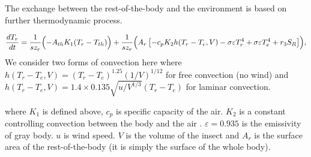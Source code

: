 The exchange between the rest-of-the-body and the environment is based on further thermodynamic process. 

\begin{equation} \label{eq:dTr} 
		\frac{dT_{r}}{dt} =  \frac{1}{s z_{r}} \Bigl( - A_{th} K_1(T_r - T_{th})  \Bigr)
			+ \frac{1}{s z_{r}} \Bigl( A_r \left[ - c_p K_2 h(T_r -T_e, V)- \sigma \varepsilon T_r^4 + \sigma \varepsilon T_e^4  + r_3 S_R  \right] \Bigr),
\end{equation}
We consider two forms of convection here where $ h(T_r -T_e, V) = (T_r- T_e)^{1.25} (1/V)^{1/12 }$ for free convection (no wind) and $ h(T_r -T_e, V) =  1.4 \times 0.135 \sqrt{u/V^{1/3}} (T_r- T_e) $ for laminar convection.

where $K_1$ is defined above, $c_p$ is specific capacity of the air. 
$K_2$ is a constant controlling convection between the body and the air \citep{Campbell2012}.
$\varepsilon = 0.935$  is the emissivity of gray body.
$u$ is wind speed.
$V$ is the volume of the insect and $A_r$ is the surface area of the rest-of-the-body (it is simply the surface of the whole body).

